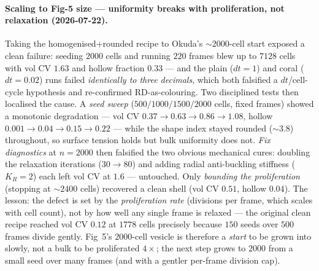 \documentclass[11pt]{article}
\begin{document}
\paragraph{Scaling to Fig-5 size --- uniformity breaks with proliferation, not relaxation (2026-07-22).}
Taking the homogenised+rounded recipe to Okuda's $\sim2000$-cell start exposed a clean failure: seeding
$2000$ cells and running $220$ frames blew up to $7128$ cells with vol CV $1.63$ and hollow fraction
$0.33$ --- and the plain ($dt\!=\!1$) and coral ($dt\!=\!0.02$) runs failed \emph{identically to three
decimals}, which both falsified a $dt$/cell-cycle hypothesis and re-confirmed RD-as-colouring. Two
disciplined tests then localised the cause. A \emph{seed sweep} ($500/1000/1500/2000$ cells, fixed
frames) showed a monotonic degradation --- vol CV $0.37\!\to\!0.63\!\to\!0.86\!\to\!1.08$, hollow
$0.001\!\to\!0.04\!\to\!0.15\!\to\!0.22$ --- while the shape index stayed rounded ($\sim3.8$) throughout,
so surface tension holds but bulk uniformity does not. \emph{Fix diagnostics} at $n\!=\!2000$ then
falsified the two obvious mechanical cures: doubling the relaxation iterations ($30\!\to\!80$) and adding
radial anti-buckling stiffness ($K_R\!=\!2$) each left vol CV at $1.6$ --- untouched. Only \emph{bounding
the proliferation} (stopping at $\sim2400$ cells) recovered a clean shell (vol CV $0.51$, hollow $0.04$).
The lesson: the defect is set by the \emph{proliferation rate} (divisions per frame, which scales with
cell count), not by how well any single frame is relaxed --- the original clean recipe reached vol CV
$0.12$ at $1778$ cells precisely because $150$ seeds over $500$ frames divide gently. Fig~5's $2000$-cell
vesicle is therefore a \emph{start} to be grown into slowly, not a bulk to be proliferated $4\times$; the
next step grows to $2000$ from a small seed over many frames (and with a gentler per-frame division cap).
\end{document}
